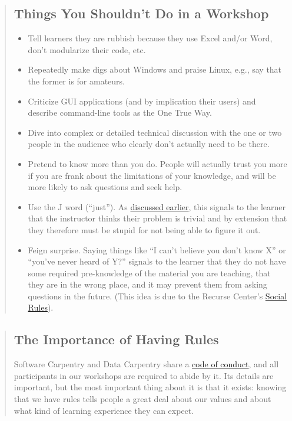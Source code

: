 \begin{quotation}   %
\subsection*{Things You Shouldn't Do in a Workshop}

\begin{itemize}
\item Tell learners they are rubbish because they use Excel and/or Word,
don't modularize their code, etc.
\item Repeatedly make digs about Windows and praise Linux, e.g., say that
the former is for amateurs.
\item Criticize GUI applications (and by implication their users) and
describe command-line tools as the One True Way.
\item Dive into complex or detailed technical discussion with the one or
two people in the audience who clearly don't actually need to be
there.
\item Pretend to know more than you do.  People will actually trust you
more if you are frank about the limitations of your knowledge, and
will be more likely to ask questions and seek help.
\item Use the J word (``just'').
As \href{\{\{ page.root \}\}/08-memory/}{discussed earlier},
this signals to the learner that
the instructor thinks their problem is trivial
and by extension that they therefore must be stupid
for not being able to figure it out.
\item Feign surprise. Saying things like ``I can't believe you don't know X''
or ``you've never heard of Y?'' signals to the learner that they do not have
some required pre-knowledge of the material you are teaching, that they
are in the wrong place, and it may prevent them from asking questions in
the future. (This idea is due to the Recurse Center's \href{https://www.recurse.com/manual\#sec-environment}{Social Rules}).
\end{itemize}
\end{quotation}   %

\begin{quotation}   %
\subsection*{The Importance of Having Rules}

Software Carpentry and Data Carpentry share a
\href{\{\{ site.swc\_site \}\}/conduct/}{code of conduct},
and all participants in our workshops are required to abide by it.
Its details are important,
but the most important thing about it is that it exists:
knowing that we have rules
tells people a great deal about our values
and about what kind of learning experience they can expect.
\end{quotation}   %

